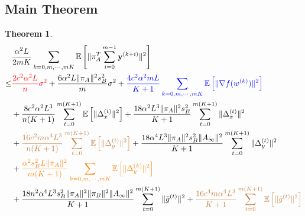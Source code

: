 \documentclass{article}
\newtheorem{theorem}{Theorem}
\newcommand{\vy}{{\mathbf{y}}}
\newcommand{\EE}[1]{\mathbb{E}\left[#1\right]}
\newcommand{\norm}[1]{\| #1 \|}
\begin{document}
\subsection{Main Theorem}

\begin{theorem}\label{Convergence Analysis: Quadratic Term-Decomposition, main theorem}
  \begin{align*}
    &\frac{\alpha^2 L}{2mK}\sum_{k=0,m,\cdots,mK}\EE{\norm{\pi_A^T\sum_{i=0}^{m-1}\vy^{(k+i)}}^2}\\
    \leq&\textcolor{red}{ \frac{2c^2\alpha^2L}{n}\sigma^2}+\frac{6\alpha^2L\norm{\pi_A}^2s_B^2}{m}\sigma^2+ \textcolor{blue}{\frac{4c^2\alpha^2mL}{K+1}\sum_{k=0,m,\cdots,mK}\EE{\norm{\nabla f(w^{(k)})}^2}}\\&+\frac{8c^2\alpha^2L^3}{n(K+1)}\sum_{t=0}^{m(K+1)}\EE{\norm{\Delta_x^{(t)}}^2}+\frac{18\alpha^2L^3\norm{\pi_A}^2s_B^2}{ K+1}\sum_{t=0}^{m(K+1)}\norm{\Delta_x^{(t)}}^2\\&+\textcolor{brown}{\frac{16c^2m\alpha^4L^3}{n(K+1)}\sum_{t=0}^{m(K+1)}\EE{\norm{\Delta_y^{(t)}}^2}}+\frac{18\alpha^4L^3\norm{\pi_A}^2s_B^2\norm{A_{\infty}}^2}{ K+1}\sum_{t=0}^{m(K+1)}\norm{\Delta_y^{(t)}}^2
    \\&+\textcolor{orange}{\frac{\alpha^2s_B^2L\norm{\pi_A}^2}{m(K+1)}\sum_{k=0,m,\cdots,mK}\EE{\norm{\Delta_y^{(k)}}^2}}
    \\&+\frac{18n^2\alpha^4L^3s_B^2\norm{\pi_A}^2\norm{\pi_B}^2\norm{A_{\infty}}^2}{ K+1}\sum_{t=0}^{m(K+1)}\norm{\bar{g}^{(t)}}^2+\textcolor{brown}{\frac{16c^4m\alpha^4L^3}{K+1}\sum_{t=0}^{m(K+1)}\EE{\norm{\bar{g}^{(t)}}^2}}
  \end{align*}
\end{theorem}
\end{document}

